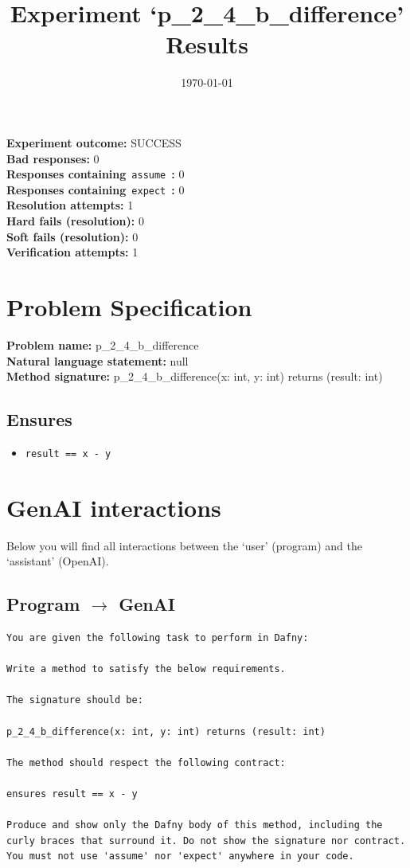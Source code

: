 \documentclass{article}
\begin{document}
\title{Experiment `p\_2\_4\_b\_difference' Results}
\author{\today}
\date{}
\maketitle
\textbf{Experiment outcome: }SUCCESS
\\\textbf{Bad responses: }0
\\\textbf{Responses containing}~\texttt{assume}~\textbf{: }0
\\\textbf{Responses containing}~\texttt{expect}~\textbf{: }0
\\\textbf{Resolution attempts: }1
\\\textbf{Hard fails (resolution): }0
\\\textbf{Soft fails (resolution): }0
\\\textbf{Verification attempts: }1
\section*{Problem Specification}
\textbf{Problem name: }p\_2\_4\_b\_difference
\\\textbf{Natural language statement: }null
\\\textbf{Method signature: }p\_2\_4\_b\_difference(x: int, y: int) returns (result: int)
\subsection*{Ensures}
\begin{itemize}
\item \texttt{result == x - y}
\end{itemize}
\clearpage
\section*{GenAI interactions}
Below you will find all interactions between the `user' (program) and the `assistant' (OpenAI).
\subsection*{Program $\rightarrow$ GenAI}
\begin{lstlisting}
You are given the following task to perform in Dafny:

Write a method to satisfy the below requirements.

The signature should be:

p_2_4_b_difference(x: int, y: int) returns (result: int)

The method should respect the following contract:

ensures result == x - y

Produce and show only the Dafny body of this method, including the curly braces that surround it. Do not show the signature nor contract. You must not use 'assume' nor 'expect' anywhere in your code.
\end{lstlisting}
\end{document}
